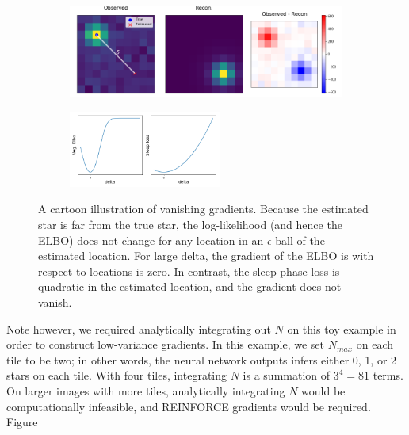 \begin{figure}[!htb]
    \centering
    \begin{subfigure}[t]{0.8\textwidth}
    \centering
    \includegraphics[width=\textwidth]{figures/gradzero_cartoon.png}
    \end{subfigure}
    \begin{subfigure}[t]{\textwidth}
    \centering
    \includegraphics[width=0.55\textwidth]{figures/gradzero_cartoon2.png}
    \end{subfigure}
    \vspace{-3em}
    \caption{A cartoon illustration of vanishing gradients. Because the estimated star is far from the true star, the log-likelihood (and hence the ELBO) does not change for any location in an $\epsilon$ ball of the estimated location. 
    For large delta, the gradient of the ELBO is with respect to locations is zero. In contrast, the sleep phase loss is quadratic in the estimated location, and the gradient does not vanish. }
    \label{fig:gradzero_cartoon}
\end{figure}

Note however, we required analytically integrating out $N$ on this toy example in order to construct low-variance gradients. In this example, we set $N_{max}$ on each tile to be two; in other words, the neural network outputs infers either 0, 1, or 2 stars on each tile. With four tiles, integrating $N$ is a summation of $3^4 = 81$ terms. On larger images with more tiles, analytically integrating $N$ would be computationally infeasible, and REINFORCE gradients would be required. Figure~

